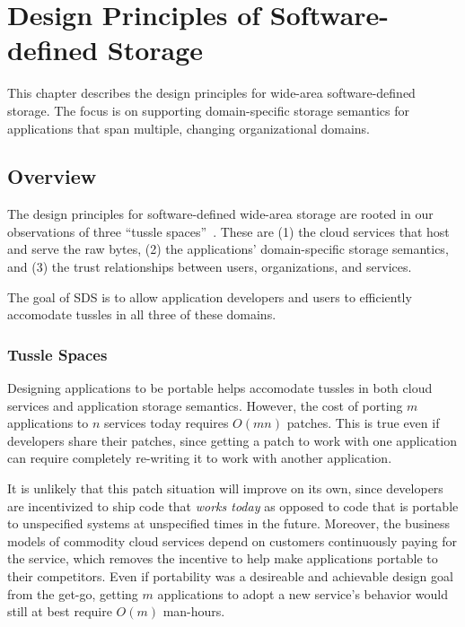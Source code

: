 \chapter{Design Principles of Software-defined Storage}
\label{chap:design_principles}

This chapter describes the design principles for wide-area
software-defined storage.  The focus is on supporting domain-specific storage
semantics for applications that span multiple, changing
organizational domains.

\section{Overview}

The design principles for software-defined wide-area storage are rooted in 
our observations of three ``tussle spaces''~\cite{david-clark-tussle-spaces}.
These are (1) the cloud services that host and serve the raw
bytes, (2) the applications' domain-specific storage semantics, and (3) the trust
relationships between users, organizations, and services.

The goal of SDS is to allow application developers and users to efficiently accomodate tussles
in all three of these domains.

\subsection{Tussle Spaces}

Designing applications to be portable helps accomodate tussles in both
cloud services and application storage semantics.
However, the cost of porting $m$ applications to $n$ services
today requires $O(mn)$ patches.  This is true even if developers share their
patches, since getting a patch to work with one application can require completely
re-writing it to work with another application.

It is unlikely that this patch situation will improve on its own,
since developers are incentivized to ship code that \emph{works
today} as opposed to code that is portable to unspecified systems at unspecified
times in the future.  Moreover, the business models of commodity cloud services
depend on customers continuously paying for the service, which removes the
incentive to help make applications portable to their competitors.
Even if portability was a desireable and achievable design goal from the get-go,
getting $m$ applications to adopt a new service's behavior would still at best
require $O(m)$ man-hours.

